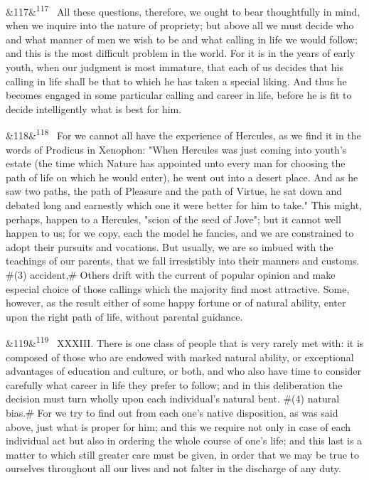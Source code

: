 \documentclass[12pt]{article}
\newcommand{\para}[1][]{\par\noindent\ifx&#1&\else\textsuperscript{\footnotesize #1}~\fi}
\begin{document}
\para[117] All these questions, therefore, we ought to bear thoughtfully in mind, when we inquire into the nature of propriety; but above all we must decide who and what manner of men we wish to be and what calling in life we would follow; and this is the most difficult problem in the world. For it is in the years of early youth, when our judgment is most immature, that each of us decides that his calling in life shall be that to which he has taken a special liking. And thus he becomes engaged in some particular calling and career in life, before he is fit to decide intelligently what is best for him.

\para[118] For we cannot all have the experience of Hercules, as we find it in the words of Prodicus in Xenophon: "When Hercules was just coming into youth's estate (the time which Nature has appointed unto every man for choosing the path of life on which he would enter), he went out into a desert place. And as he saw two paths, the path of Pleasure and the path of Virtue, he sat down and debated long and earnestly which one it were better for him to take." This might, perhaps, happen to a Hercules, "scion of the seed of Jove"; but it cannot well happen to us; for we copy, each the model he fancies, and we are constrained to adopt their pursuits and vocations. But usually, we are so imbued with the teachings of our parents, that we fall irresistibly into their manners and customs. \#(3) accident,\# Others drift with the current of popular opinion and make especial choice of those callings which the majority find most attractive. Some, however, as the result either of some happy fortune or of natural ability, enter upon the right path of life, without parental guidance.

\para[119] XXXIII. There is one class of people that is very rarely met with: it is composed of those who are endowed with marked natural ability, or exceptional advantages of education and culture, or both, and who also have time to consider carefully what career in life they prefer to follow; and in this deliberation the decision must turn wholly upon each individual's natural bent. \#(4) natural bias.\# For we try to find out from each one's native disposition, as was said above, just what is proper for him; and this we require not only in case of each individual act but also in ordering the whole course of one's life; and this last is a matter to which still greater care must be given, in order that we may be true to ourselves throughout all our lives and not falter in the discharge of any duty.
\end{document}
